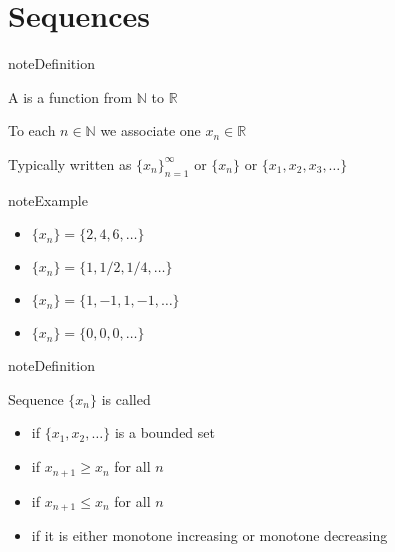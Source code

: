 \documentclass[letterpaper,10pt,english]{jupyterBook}
\begin{document}
\section{Sequences}
\label{\detokenize{04.basic_analysis:sequences}}
\begin{sphinxadmonition}{note}{Definition}

\sphinxAtStartPar
A  is a function from \(\mathbb{N}\) to \(\mathbb{R}\)
\end{sphinxadmonition}

\sphinxAtStartPar
To each \(n \in \mathbb{N}\) we associate one \(x_n \in \mathbb{R}\)

\sphinxAtStartPar
Typically written as \(\{x_n\}_{n=1}^{\infty}\) or \(\{x_n\}\) or \(\{x_1, x_2, x_3, \ldots\}\)

\begin{sphinxadmonition}{note}{Example}
\begin{itemize}
\item {} 
\sphinxAtStartPar
\(\{x_n\} = \{2, 4, 6, \ldots \}\)

\item {} 
\sphinxAtStartPar
\(\{x_n\} = \{1, 1/2, 1/4, \ldots \}\)

\item {} 
\sphinxAtStartPar
\(\{x_n\} = \{1, -1, 1, -1, \ldots \}\)

\item {} 
\sphinxAtStartPar
\(\{x_n\} = \{0, 0, 0, \ldots \}\)

\end{itemize}
\end{sphinxadmonition}

\begin{sphinxadmonition}{note}{Definition}

\sphinxAtStartPar
Sequence \(\{x_n\}\) is called
\begin{itemize}
\item {} 
\sphinxAtStartPar
{} if \(\{x_1, x_2, \ldots\}\) is a bounded set

\item {} 
\sphinxAtStartPar
{}  if \(x_{n+1} \geq x_n\) for all \(n\)

\item {} 
\sphinxAtStartPar
{}  if \(x_{n+1} \leq x_n\) for all \(n\)

\item {} 
\sphinxAtStartPar
{}  if it is either monotone increasing or monotone decreasing

\end{itemize}
\end{sphinxadmonition}
\end{document}
